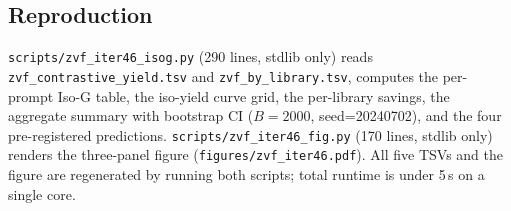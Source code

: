 \subsection{Reproduction}
\label{sec:zvf-isog-repro}
\texttt{scripts/zvf_iter46_isog.py} (290 lines, stdlib only) reads
\texttt{zvf_contrastive_yield.tsv} and \texttt{zvf_by_library.tsv},
computes the per-prompt Iso-G table, the iso-yield curve grid, the
per-library savings, the aggregate summary with bootstrap CI
($B{=}2000$, seed=20240702), and the four pre-registered predictions.
\texttt{scripts/zvf_iter46_fig.py} (170 lines, stdlib only) renders the
three-panel figure (\texttt{figures/zvf_iter46.pdf}). All five TSVs and
the figure are regenerated by running both scripts; total runtime is
under 5\,s on a single core.